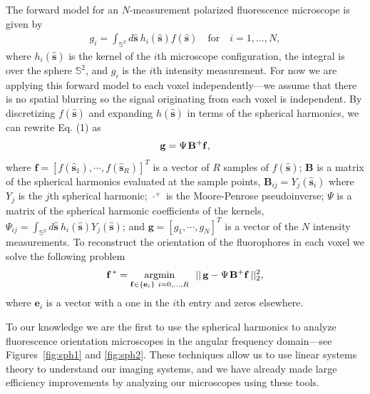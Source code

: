 \documentclass[11pt]{article}
\begin{document}
  The forward model for an $N$-measurement polarized fluorescence microscope is
  given by
\begin{align}
  g_i = \int_{\mathbb{S}^2}d\hat{\mathbf{s}}\ h_i(\hat{\mathbf{s}})f(\hat{\mathbf{s}})\hspace{1em}\text{for}\hspace{1em} i=1,\dotsc,N,
\end{align}
where $h_i(\hat{\mathbf{s}})$ is the kernel of the $i$th microscope
configuration, the integral is over the sphere $\mathbb{S}^2$, and $g_i$ is the
$i$th intensity measurement. For now we are applying this forward model to each
voxel independently---we assume that there is no spatial blurring so the signal
originating from each voxel is independent. By discretizing
$f(\hat{\mathbf{s}})$ and expanding $h(\hat{\mathbf{s}})$ in terms of the
spherical harmonics, we can rewrite Eq. (1) as
\begin{align}
  \mathbf{g} = \Psi\hspace{0.1em}\mathbf{B}^+\mathbf{f},
\end{align}
where $\mathbf{f} = [f(\hat{\mathbf{s}}_1), \cdots, f(\hat{\mathbf{s}}_R)]^T$ is
a vector of $R$ samples of $f(\hat{\mathbf{s}})$; $\mathbf{B}$ is a matrix of
the spherical harmonics evaluated at the sample points,
$\mathbf{B}_{ij} = Y_j(\hat{\mathbf{s}}_i)$ where $Y_j$ is the $j$th spherical
harmonic; $\cdot^+$ is the Moore-Penrose pseudoinverse; $\Psi$ is a matrix of
the spherical harmonic coefficients of the kernels,
$\Psi_{ij} = \int_{\mathbb{S}^2}d\hat{\textbf{s}}\
h_i(\hat{\mathbf{s}})Y_j(\hat{\mathbf{s}})$; and
$\mathbf{g} = [g_1, \cdots, g_N]^T$ is a vector of the $N$ intensity
measurements. To reconstruct the orientation of the fluorophores in each voxel
we solve the following problem
\begin{align}
\mathbf{f^{\thinspace *}}= \underset{\mathbf{f}\in\{\mathbf{e}_i\}\ i = 0,\dotsc,R}{\text{argmin}}
\ \ ||\thinspace\mathbf{g} - \Psi\hspace{0.1em}\mathbf{B}^+\mathbf{f}\thinspace||_2^2,
\end{align}
where $\mathbf{e}_i$ is a vector with a one in the $i$th entry and zeros
elsewhere.

To our knowledge we are the first to use the spherical harmonics to analyze
fluorescence orientation microscopes in the angular frequency domain---see
Figures~\ref{fig:sph1} and \ref{fig:sph2}. These techniques allow us to use
linear systems theory to understand our imaging systems, and we have already
made large efficiency improvements by analyzing our microscopes using these
tools.
\end{document}

